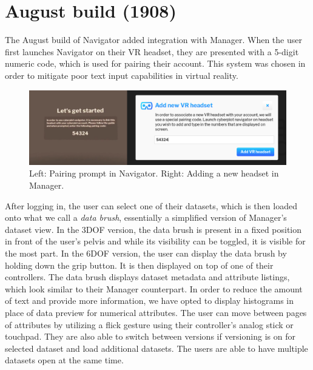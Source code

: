 \documentclass[thesis=M,english,hidelinks]{FITthesisXE}[2012/06/26]
\begin{document}
\section{August build (1908)}

The August build of Navigator added integration with Manager. When the user first launches Navigator on their VR headset, they are presented with a 5-digit numeric code, which is used for pairing their account. This system was chosen in order to mitigate poor text input capabilities in virtual reality.

\begin{figure}[ht]
\centering
\includegraphics[scale=0.2]{pairing}
\caption{Left: Pairing prompt in Navigator. Right: Adding a new headset in Manager.}
\label{fig:pairing}
\end{figure}

After logging in, the user can select one of their datasets, which is then loaded onto what we call a \emph{data brush}, essentially a simplified version of Manager's dataset view. In the 3DOF version, the data brush is present in a fixed position in front of the user's pelvis and while its visibility can be toggled, it is visible for the most part. In the 6DOF version, the user can display the data brush by holding down the grip button. It is then displayed on top of one of their controllers. The data brush displays dataset metadata and attribute listings, which look similar to their Manager counterpart. In order to reduce the amount of text and provide more information, we have opted to display histograms in place of data preview for numerical attributes. The user can move between pages of attributes by utilizing a flick gesture using their controller's analog stick or touchpad. They are also able to switch between versions if versioning is on for selected dataset and load additional datasets. The users are able to have multiple datasets open at the same time.
\end{document}
